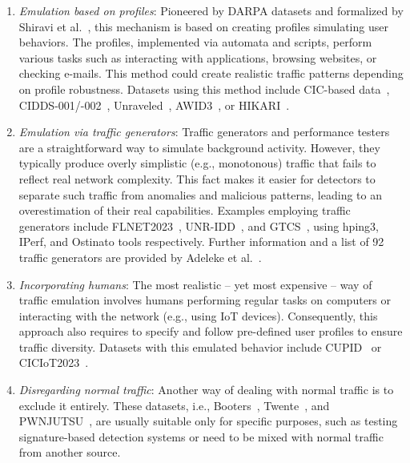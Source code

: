 \begin{enumerate}[topsep=0pt]
    \item \emph{Emulation based on profiles}: Pioneered by DARPA datasets and formalized by Shiravi et al.~\cite{shiravi2012_iscx2012}, this mechanism is based on creating profiles simulating user behaviors. The profiles, implemented via automata and scripts, perform various tasks such as interacting with applications, browsing websites, or checking e-mails. This method could create realistic traffic patterns depending on profile robustness. Datasets using this method include CIC-based data~\cite{shiravi2012_iscx2012, sharafin2018_cicids2017_csecic2018}, CIDDS-001/-002~\cite{ring2017_cidds001, ring2017_cidds002}, Unraveled~\cite{myneni2023_unraveled}, AWID3~\cite{chatzoglou2021_awid3_dataset}, or HIKARI~\cite{ferriyan2021_hikari2021}.
    
    \item \emph{Emulation via traffic generators}: Traffic generators and performance testers are a straightforward way to simulate background activity. However, they typically produce overly simplistic (e.g., monotonous) traffic that fails to reflect real network complexity. This fact makes it easier for detectors to separate such traffic from anomalies and malicious patterns, leading to an overestimation of their real capabilities. Examples employing traffic generators include FLNET2023~\cite{kumar2023_flnet2023}, UNR-IDD~\cite{das2023_unridd_dataset}, and GTCS~\cite{mahfouz2020_gtcs}, using hping3, IPerf, and Ostinato tools respectively. Further information and a list of 92 traffic generators are provided by Adeleke et al.~\cite{adeleke2022_network_traffic_generation_survey}.
    
    \item \emph{Incorporating humans}: The most realistic -- yet most expensive -- way of traffic emulation involves humans performing regular tasks on computers or interacting with the network (e.g., using IoT devices). Consequently, this approach also requires to specify and follow pre-defined user profiles to ensure traffic diversity. Datasets with this emulated behavior include CUPID~\cite{lawrence2022_cupid} or CICIoT2023~\cite{neto2023_ciciot2023}.
    
    \item \emph{Disregarding normal traffic}: Another way of dealing with normal traffic is to exclude it entirely. These datasets, i.e., Booters~\cite{santanna2015_booters}, Twente~\cite{sperotto2009_twente_dataset}, and PWNJUTSU~\cite{berady2022_pwnjutsu_dataset}, are usually suitable only for specific purposes, such as testing signature-based detection systems or need to be mixed with normal traffic from another source.
\end{enumerate}

